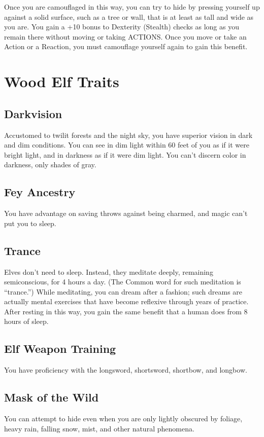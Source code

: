 \documentclass[letterpaper,openany,oneside,twocolumn]{book}
\begin{document}
Once you are camouflaged in this way, you can try to hide by pressing yourself up against a solid surface, such as a tree or wall, that is at least as tall and wide as you are. You gain a +10 bonus to Dexterity (Stealth) checks as long as you remain there without moving or taking ACTIONS. Once you move or take an Action or a Reaction, you must camouflage yourself again to gain this benefit.

\section*{Wood Elf Traits}
\subsection*{Darkvision}
Accustomed to twilit forests and the night sky, you have superior vision in dark and dim conditions. You can see in dim light within 60 feet of you as if it were bright light, and in darkness as if it were dim light. You can't discern color in darkness, only shades of gray.

\subsection*{Fey Ancestry}
You have advantage on saving throws against being charmed, and magic can't put you to sleep.

\subsection*{Trance}
Elves don't need to sleep. Instead, they meditate deeply, remaining semiconscious, for 4 hours a day. (The Common word for such meditation is “trance.”) While meditating, you can dream after a fashion; such dreams are actually mental exercises that have become reflexive through years of practice. After resting in this way, you gain the same benefit that a human does from 8 hours of sleep.

\subsection*{Elf Weapon Training}
You have proficiency with the longsword, shortsword, shortbow, and longbow.

\subsection*{Mask of the Wild}
You can attempt to hide even when you are only lightly obscured by foliage, heavy rain, falling snow, mist, and other natural phenomena.
\end{document}
